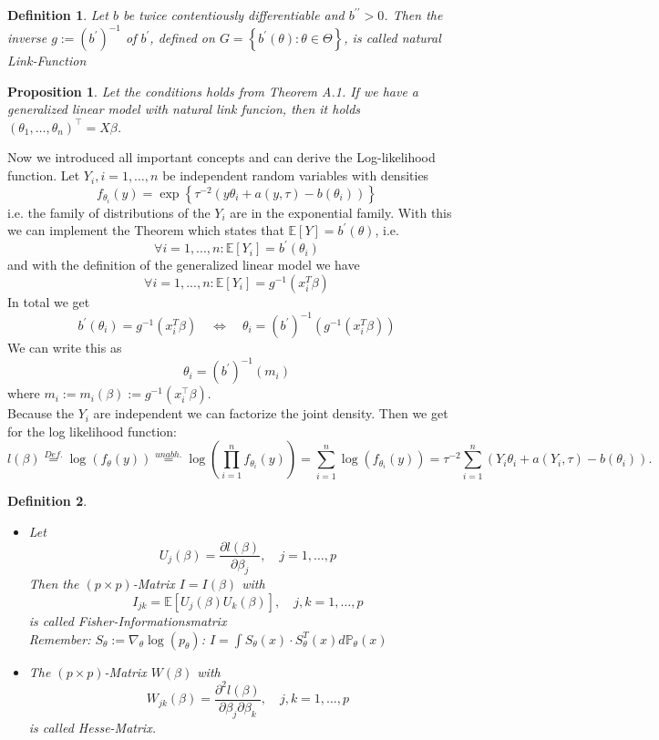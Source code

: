 \documentclass[a4paper,oneside,bibliography=totoc]{scrartcl}
\newtheorem{defn}{Definition}[section] %
\newtheorem{prop}{Proposition}[section]
\begin{document}
\begin{defn}
     Let $b$ be twice contentiously differentiable and $b^{\prime \prime}>0$. Then the inverse $g:=\left(b^{\prime}\right)^{-1}$ of $b^{\prime}$, defined on $G=\left\{b^{\prime}(\theta): \theta \in \Theta\right\}$, is called natural Link-Function
\end{defn}

\begin{prop}
Let the conditions holds from Theorem A.1. If we have a generalized linear model with natural link funcion, then it holds $\left(\theta_1, \ldots, \theta_n\right)^{\top}=X \beta$.
\end{prop}
Now we introduced all important concepts and can derive the Log-likelihood function.
Let $Y_i, i=1, \ldots, n$ be independent random variables with densities
$$
f_{\theta_{i}}(y)=\exp \left\{\tau^{-2}\left(y \theta_i+a(y, \tau)-b\left(\theta_i\right)\right)\right\}
$$
i.e. the family of distributions of the $Y_{i}$ are in the exponential family. With this we can implement the Theorem which states that  $\mathbb{E}[Y]=b^{\prime}(\theta)$, i.e.
$$
\forall i=1,...,n: \mathbb{E}[Y_{i}]=b^{\prime}(\theta_{i})
$$
and with the definition of the generalized linear model we have
$$
\forall i=1,...,n: \mathbb{E}[Y_{i}]=g^{-1}(x_{i}^{T}\beta)
$$
In total we get
$$
b^{\prime}(\theta_{i})=g^{-1}(x_{i}^{T}\beta) \quad \iff \quad \theta_{i}=(b^{\prime})^{-1}\left(g^{-1}(x_{i}^{T}\beta)\right)
$$
We can write this as
$$
\theta_i=\left(b^{\prime}\right)^{-1}\left(m_i\right)
$$
where $m_i:=m_i(\beta):=g^{-1}\left(x_i^{\top} \beta\right)$. \\
Because the $Y_{i}$ are independent we can factorize the joint density. Then we get for the log likelihood function:
$$
l(\beta)\stackrel{Def.}{=}\log(f_{\theta}(y))\stackrel{unabh.}{=}\log(\prod_{i=1}^{n} f_{\theta_{i}}(y))=\sum_{i=1}^{n}\log(f_{\theta_{i}}(y))=\tau^{-2} \sum_{i=1}^n\left(Y_i \theta_i+a\left(Y_i, \tau\right)-b\left(\theta_i\right)\right) .
$$
\begin{defn} \text{ }
\begin{itemize}
    \item [1.] Let
$$
U_j(\beta)=\frac{\partial l(\beta)}{\partial \beta_j}, \quad j=1, \ldots, p
$$
Then the $(p \times p)$-Matrix $I=I(\beta)$ with
$$
I_{j k}=\mathbb{E} [U_j(\beta) U_k(\beta)], \quad j, k=1, \ldots, p
$$
is called Fisher-Informationsmatrix\\
Remember: $S_{\theta}:=\nabla_{\theta} \log(p_{\theta})$: $I=\int S_{\theta}(x)\cdot S_{\theta}^{T}(x) d\mathbb{P}_{\theta}(x)$
\item [2.] The $(p \times p)$-Matrix $W(\beta)$ with
$$
W_{j k}(\beta)=\frac{\partial^2 l(\beta)}{\partial \beta_j \partial \beta_k}, \quad j, k=1, \ldots, p
$$
is called Hesse-Matrix.
\end{itemize}
\end{defn}
\end{document}
